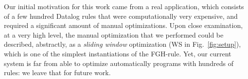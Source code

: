 

Our initial motivation for this work came from a real application,
which consists of a few hundred Datalog rules that were
computationally very expensive, and required a significant amount of
manual optimizations.  Upon close examination, at a very high level,
the manual optimization that we performed could be described,
abstractly, as a {\em sliding window} optimization (WS in
Fig.~\ref{fig:setup}), which is one of the simplest instantiations of
the FGH-rule.  Yet, our current system is far from able to optimize
automatically programs with hundreds of rules: we leave that for
future work.


